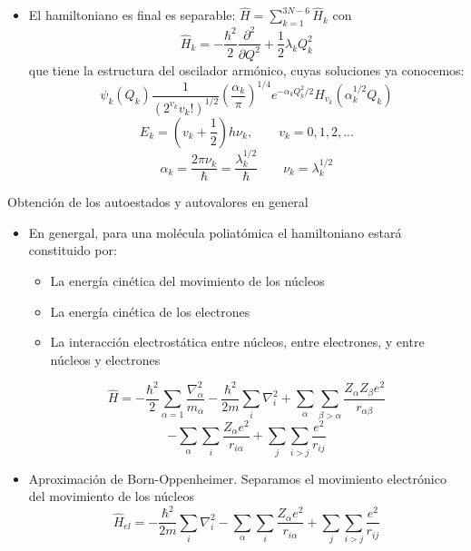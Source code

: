 \documentclass[a4paper]{beamer}
\begin{document}
\begin{frame}
\begin{itemize}
\item El hamiltoniano es final es separable: $\hat H=\displaystyle\sum_{k=1}^{3N-6} \hat H_k$ con
\begin{equation*}
\hat H_k = -\frac{\hbar^2}{2}\frac{\partial^2}{\partial Q^2}+\frac{1}{2}\lambda_kQ_k^2
\end{equation*}
que tiene la estructura del oscilador armónico, cuyas soluciones ya conocemos:
\begin{equation*}
\psi_k(Q_k)\frac{1}{\left(2^{v_k}v_k!\right)^{1/2}}\left(\frac{\alpha_k}{\pi}\right)^{1/4}e^{-\alpha_kQ^2_k/2}H_{v_k}(\alpha_k^{1/2}Q_k)
\end{equation*}
\begin{equation*}
E_k=\left(v_k+\frac{1}{2}\right)h\nu_k,	\qquad v_k=0,1,2,...
\end{equation*}
\begin{equation*}
\alpha_k=\frac{2\pi\nu_k}{\hbar}=\frac{\lambda_k^{1/2}}{\hbar} \qquad \nu_k=\lambda_k^{1/2}
\end{equation*}
\end{itemize}
\end{frame}

\begin{frame}{Obtención de los autoestados y autovalores en general}
\begin{itemize}
\item En genergal, para una molécula poliatómica el hamiltoniano estará constituido por:
\begin{itemize}
\item La energía cinética del movimiento de los núcleos
\item La energía cinética de los electrones
\item La interacción electrostática entre núcleos, entre electrones, y entre núcleos y electrones
\end{itemize}
$$
\hat H = -\frac{\hbar^2}{2}\sum_{\alpha=1}\frac{\nabla_\alpha^2}{m_\alpha}-\frac{\hbar^2}{2m}\sum_{i}\nabla_i^2+\sum_\alpha\sum_{\beta >\alpha}\frac{Z_\alpha Z_\beta e^2}{r_{\alpha \beta}}
$$
\begin{equation*}
-\sum_\alpha\sum_i\frac{Z_\alpha e^2}{r_{i\alpha}}+\sum_j\sum_{i>j}\frac{e^2}{r_{ij}}
\end{equation*}
\item Aproximación de Born-Oppenheimer. Separamos el movimiento electrónico del movimiento de los núcleos
\begin{equation*}
\hat H_{el} = -\frac{\hbar^2}{2m}\sum_{i}\nabla_i^2-\sum_\alpha\sum_i\frac{Z_\alpha e^2}{r_{i\alpha}}+\sum_j\sum_{i>j}\frac{e^2}{r_{ij}}
\end{equation*}
\end{itemize}
\end{frame}
\end{document}
